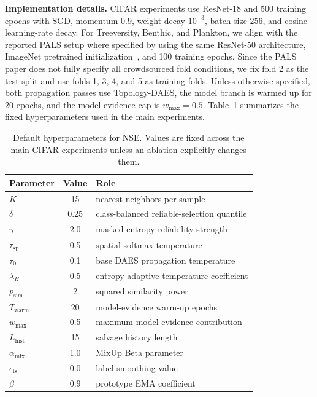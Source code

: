 \textbf{Implementation details.}
CIFAR experiments use ResNet-18 and 500 training epochs with SGD, momentum
$0.9$, weight decay $10^{-3}$, batch size $256$, and cosine learning-rate
decay. For Treeversity, Benthic, and Plankton, we align with the reported PALS
setup where specified by using the same ResNet-50 architecture, ImageNet
pretrained initialization~\cite{he2016deep,russakovsky2015imagenet}, and 100
training epochs. Since the PALS paper does not fully specify all crowdsourced
fold conditions, we fix fold 2 as the test split and use folds 1, 3, 4, and 5
as training folds. Unless otherwise specified, both propagation passes use
Topology-DAES, the model branch is warmed up for 20 epochs, and the
model-evidence cap is $w_{\max}=0.5$. Table~\ref{tab:hparams} summarizes the
fixed hyperparameters used in the main experiments.

\begin{table}[t]
\centering
\scriptsize
\setlength{\tabcolsep}{4pt}
\begin{tabular}{l|c|l}
\toprule
\textbf{Parameter} & \textbf{Value} & \textbf{Role} \\
\midrule
$K$ & 15 & nearest neighbors per sample \\
$\delta$ & 0.25 & class-balanced reliable-selection quantile \\
$\gamma$ & 2.0 & masked-entropy reliability strength \\
$\tau_{\mathrm{sp}}$ & 0.5 & spatial softmax temperature \\
$\tau_0$ & 0.1 & base DAES propagation temperature \\
$\lambda_H$ & 0.5 & entropy-adaptive temperature coefficient \\
$p_{\mathrm{sim}}$ & 2 & squared similarity power \\
$T_{\mathrm{warm}}$ & 20 & model-evidence warm-up epochs \\
$w_{\max}$ & 0.5 & maximum model-evidence contribution \\
$L_{\mathrm{hist}}$ & 15 & salvage history length \\
$\alpha_{\mathrm{mix}}$ & 1.0 & MixUp Beta parameter \\
$\epsilon_{\mathrm{ls}}$ & 0.0 & label smoothing value \\
$\beta$ & 0.9 & prototype EMA coefficient \\
\bottomrule
\end{tabular}
\caption{Default hyperparameters for NSE. Values are fixed across the main CIFAR experiments unless an ablation explicitly changes them.}
\label{tab:hparams}
\end{table}

